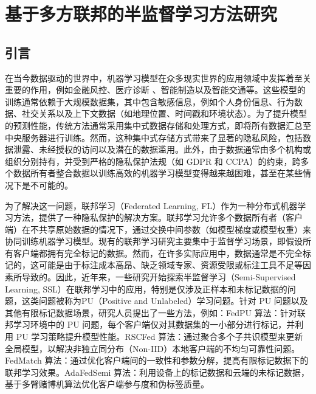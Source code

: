 

\chapter{基于多方联邦的半监督学习方法研究} %

\thispagestyle{others} %

\pagestyle{others} %

\xiaosi %


\section{引言}
在当今数据驱动的世界中，机器学习模型在众多现实世界的应用领域中发挥着至关重要的作用，例如金融风控\textsuperscript{\cite{hardt2016equality, rudin2019stop}}、医疗诊断 \textsuperscript{\cite{esteva2017dermatologist, miotto2018deep}}、智能制造\textsuperscript{\cite{lee2015cyber, tao2018digital}}以及智能交通\textsuperscript{\cite{wang2019deep, zhang2019short}}等。这些模型的训练通常依赖于大规模数据集，其中包含敏感信息，例如个人身份信息、行为数据、社交关系以及上下文数据（如地理位置、时间戳和环境状态）。为了提升模型的预测性能，传统方法通常采用集中式数据存储和处理方式，即将所有数据汇总至中央服务器进行训练。然而，这种集中式存储方式带来了显著的隐私风险，包括数据泄露、未经授权的访问以及潜在的数据滥用。此外，由于数据通常由多个机构或组织分别持有，并受到严格的隐私保护法规（如 GDPR 和 CCPA）的约束，跨多个数据所有者整合数据以训练高效的机器学习模型变得越来越困难，甚至在某些情况下是不可能的。

为了解决这一问题，联邦学习（Federated Learning, FL）作为一种分布式机器学习方法\textsuperscript{\cite{mcmahan2017communication}}，提供了一种隐私保护的解决方案。联邦学习允许多个数据所有者（客户端）在不共享原始数据的情况下，通过交换中间参数（如模型梯度或模型权重）来协同训练机器学习模型。现有的联邦学习研究主要集中于监督学习场景，即假设所有客户端都拥有完全标记的数据。然而，在许多实际应用中，数据通常是不完全标记的，这可能是由于标注成本高昂、缺乏领域专家、资源受限或标注工具不足等因素所导致的。因此，近年来，一些研究开始探索半监督学习（Semi-Supervised Learning, SSL）在联邦学习中的应用，特别是仅涉及正样本和未标记数据的问题，这类问题被称为PU（Positive and Unlabeled）学习问题。针对 PU 问题以及其他有限标记数据场景，研究人员提出了一些方法，例如：FedPU 算法\textsuperscript{\cite{lin2022federated}}：针对联邦学习环境中的 PU 问题，每个客户端仅对其数据集的一小部分进行标记，并利用 PU 学习策略提升模型性能。RSCFed 算法\textsuperscript{\cite{liang2022rscfed}}：通过聚合多个子共识模型来更新全局模型，以解决非独立同分布（Non-IID）本地客户端的不均匀可靠性问题。FedMatch 算法\textsuperscript{\cite{jeong2020federated}}：通过优化客户端间的一致性和参数分解，提高有限标记数据下的联邦学习效果。AdaFedSemi 算法\textsuperscript{\cite{wang2022enhancing}}：利用设备上的标记数据和云端的未标记数据，基于多臂赌博机算法优化客户端参与度和伪标签质量。

